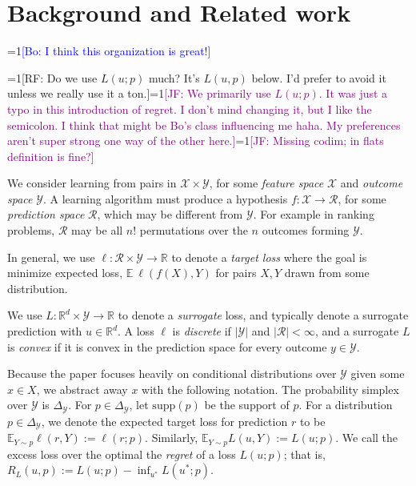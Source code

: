 \documentclass{article}
\newcommand{\Comments}{1}
\newcommand{\mynote}[2]{\ifnum\Comments=1\textcolor{#1}{#2}\fi}
\newcommand{\raf}[1]{\mynote{green!80!blue}{[RF: #1]}}
\newcommand{\jessie}[1]{\mynote{purple}{[JF: #1]}}
\newcommand{\bo}[1]{\mynote{blue}{[Bo: #1]}}
\newcommand{\reals}{\mathbb{R}}
\newcommand{\simplex}{\Delta_\Y}
\newcommand{\supp}{\mathrm{supp}}
\newcommand{\affhull}{\mathrm{affhull}}
\newcommand{\E}{\mathbb{E}}
\newcommand{\R}{\mathcal{R}}
\newcommand{\X}{\mathcal{X}}
\newcommand{\Y}{\mathcal{Y}}
\begin{document}
\section{Background and Related work}\label{sec:related-work}

\bo{I think this organization is great!}

\raf{Do we use $L(u;p)$ much?  It's $L(u,p)$ below.  I'd prefer to avoid it unless we really use it a ton.}\jessie{We primarily use $L(u;p)$. It was just a typo in this introduction of regret.  I don't mind changing it, but I like the semicolon.  I think that might be Bo's class influencing me haha.  My preferences aren't super strong one way of the other here.}\jessie{Missing codim; in flats definition is fine?}

We consider learning from pairs in $\X \times \Y$, for some \emph{feature space} $\X$ and \emph{outcome space} $\Y$.
A learning algorithm must produce a hypothesis $f: \X \to \R$, for some \emph{prediction space} $\R$, which may be different from $\Y$.
For example in ranking problems, $\R$ may be all $n!$ permutations over the $n$ outcomes forming $\Y$.

In general, we use $\ell: \R \times \Y \to \reals$ to denote a \emph{target loss} where the goal is minimize expected loss, $\E ~ \ell(f(X),Y)$ for pairs $X,Y$ drawn from some distribution.

We use $L: \reals^d \times \Y \to \reals$ to denote a \emph{surrogate} loss, and typically denote a surrogate prediction with $u \in \reals^d$.
A loss $\ell$ is \emph{discrete} if $|\Y|$ and $|\R| < \infty$, and a surrogate $L$ is \emph{convex} if it is convex in the prediction space for every outcome $y \in \Y$.

Because the paper focuses heavily on conditional distributions over $\Y$ given some $x \in X$, we abstract away $x$ with the following notation.
The probability simplex over $\Y$ is $\simplex$.
For $p \in \simplex$, let $\supp(p)$ be the support of $p$.
For a distribution $p \in \simplex$, we denote the expected target loss for prediction $r$ to be $\E_{Y \sim p} \ell(r, Y) := \ell(r; p)$.
Similarly, $\E_{Y \sim p} L(u, Y) := L(u ; p)$.
We call the excess loss over the optimal the \emph{regret} of a loss $L(u; p)$; that is, $R_L(u,p) := L(u;p) - \inf_{u^*} L(u^*; p)$.
\end{document}

